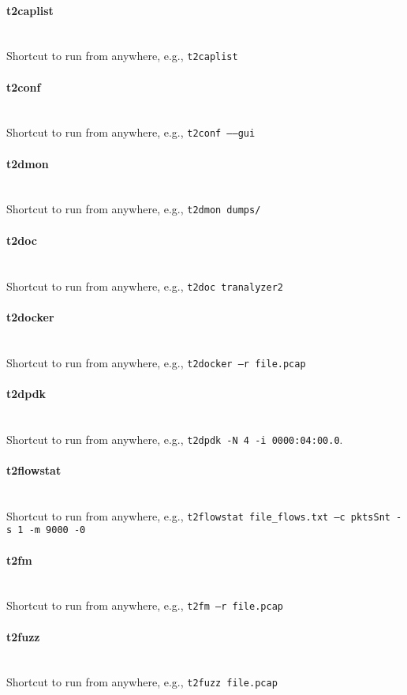 \documentclass[documentation]{subfiles}
\begin{document}
\paragraph{t2caplist}~\\
Shortcut to run  from anywhere, e.g., {\tt t2caplist}
\paragraph{t2conf}~\\
Shortcut to run  from anywhere, e.g., {\tt t2conf --{}--gui}
\paragraph{t2dmon}~\\
Shortcut to run  from anywhere, e.g., {\tt t2dmon dumps/}
\paragraph{t2doc}~\\
Shortcut to run  from anywhere, e.g., {\tt t2doc tranalyzer2}
\paragraph{t2docker}~\\
Shortcut to run  from anywhere, e.g., {\tt t2docker --r file.pcap}
\paragraph{t2dpdk}~\\
Shortcut to run  from anywhere, e.g., {\tt t2dpdk -N 4 -i 0000:04:00.0}.
\paragraph{t2flowstat}~\\
Shortcut to run  from anywhere, e.g., {\tt t2flowstat file\_flows.txt --c pktsSnt -s 1 -m 9000 -0}
\paragraph{t2fm}~\\
Shortcut to run  from anywhere, e.g., {\tt t2fm --r file.pcap}
\paragraph{t2fuzz}~\\
Shortcut to run  from anywhere, e.g., {\tt t2fuzz file.pcap}
\end{document}
